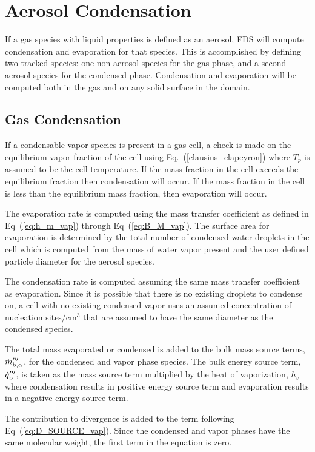 \newpage
\section{Aerosol Condensation}

If a gas species with liquid properties is defined as an aerosol, FDS will compute condensation and evaporation for that species. This is accomplished by defining two tracked species: one non-aerosol species for the gas phase, and a second aerosol species for the condensed phase. Condensation and evaporation will be computed both in the gas and on any solid surface in the domain.

\subsection{Gas Condensation}
If a condensable vapor species is present in a gas cell, a check is made on the equilibrium vapor fraction of the cell using Eq.~(\ref{clausius_clapeyron}) where $T_p$ is assumed to be the cell temperature. If the mass fraction in the cell exceeds the equilibrium fraction then condensation will occur. If the mass fraction in the cell is less than the equilibrium mass fraction, then evaporation will occur.

The evaporation rate is computed using the mass transfer coefficient as defined in Eq~(\ref{eq:h_m_vap}) through Eq~(\ref{eq:B_M_vap}). The surface area for evaporation is determined by the total number of condensed water droplets in the cell which is computed from the mass of water vapor present and the user defined particle diameter for the aerosol species.

The condensation rate is computed assuming the same mass transfer coefficient as evaporation. Since it is possible that there is no existing droplets to condense on, a cell with no existing condensed vapor uses an assumed concentration of nucleation sites/cm$^3$ that are assumed to have the same diameter as the condensed species.

The total mass evaporated or condensed is added to the bulk mass source terms, $\dot{m}_{{\rm b},\alpha}^{{\prime\prime\prime}}$, for the condensed and vapor phase species. The bulk energy source term, $\dot{q}_{\rm b}^{{\prime\prime\prime}}$, is taken as the mass source term multiplied by the heat of vaporization, $h_v$ where condensation results in positive energy source term and evaporation results in a negative energy source term.

The contribution to divergence is added to the  term following Eq~(\ref{eq:D_SOURCE_vap}). Since the condensed and vapor phases have the same molecular weight, the first term in the equation is zero.

